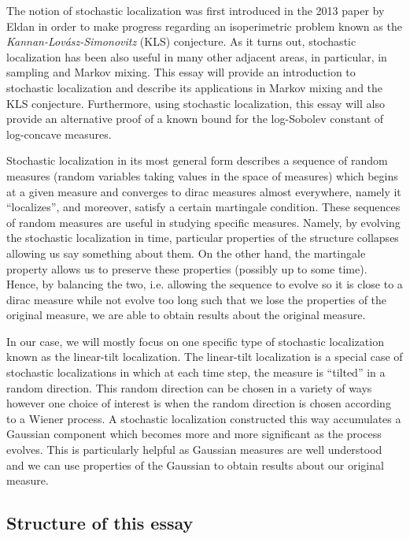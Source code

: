 The notion of stochastic localization was first introduced in the 2013 paper by Eldan \cite{Eldan_2013}
in order to make progress regarding an isoperimetric problem known as the 
\textit{Kannan-Lovász-Simonovitz} (KLS) conjecture. As it turns out, stochastic localization has been also 
useful in many other adjacent areas, in particular, in sampling and Markov mixing. This essay will 
provide an introduction to stochastic localization and describe its applications in Markov mixing and 
the KLS conjecture. Furthermore, using stochastic localization, this essay will also provide an alternative 
proof of a known bound for the log-Sobolev constant of log-concave measures. 

Stochastic localization in its most general form describes a sequence of random measures (random variables 
taking values in the space of measures) which begins at a given measure and converges to dirac 
measures almost everywhere, namely it ``localizes'', and moreover, satisfy a certain martingale 
condition. These sequences of random measures are useful in studying specific measures. Namely, 
by evolving the stochastic localization in time, particular properties of the structure collapses 
allowing us say something about them. On the other hand, the martingale property allows us to preserve 
these properties (possibly up to some time). Hence, by balancing the two, i.e. allowing the sequence 
to evolve so it is close to a dirac measure while not evolve too long such that we lose the properties 
of the original measure, we are able to obtain results about the original measure.

In our case, we will mostly focus on one specific type of stochastic localization known as the 
linear-tilt localization. The linear-tilt localization is a special case of stochastic localizations 
in which at each time step, the measure is ``tilted'' in a random direction. This random direction 
can be chosen in a variety of ways however one choice of interest is when the random direction is 
chosen according to a Wiener process. A stochastic localization constructed this way accumulates a 
Gaussian component which becomes more and more significant as the process evolves. This is particularly 
helpful as Gaussian measures are well understood and we can use properties of the Gaussian to obtain 
results about our original measure.
\subsection{Structure of this essay}

